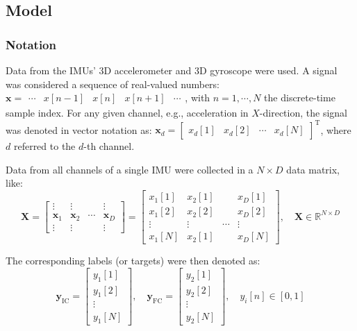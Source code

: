 \documentclass[sensors,article,submit,pdftex,moreauthors]{Definitions/mdpi}
\begin{document}
\subsection{Model}
\subsubsection{Notation}
Data from the IMUs' 3D accelerometer and 3D gyroscope were used. A signal was considered a sequence of real-valued numbers: $\mathbf{x} = \begin{array}{ccccc}
	\cdots & x[n-1] & x[n] & x[n+1] & \cdots
\end{array}$, with $n = 1, \cdots, N$ the discrete-time sample index. For any given channel, e.g., acceleration in $X$-direction, the signal was denoted in vector notation as: $\mathbf{x}_{d} = \begin{bmatrix}
x_{d}[1] & x_{d}[2] & \cdots & x_{d}[N]
\end{bmatrix}^{\mathrm{T}}$, where $d$ referred to the $d$-th channel.

Data from all channels of a single IMU were collected in a $ N \times D$ data matrix, like:
\begin{equation}
	\mathbf{X} = \begin{bmatrix}
		\vdots & \vdots &  & \vdots\\
		\mathbf{x}_{1} & \mathbf{x}_{2} & \cdots & \mathbf{x}_{D}\\
		\vdots & \vdots &  & \vdots
	\end{bmatrix} = \begin{bmatrix}
		x_{1}[1] & x_{2}[1] & & x_{D}[1]\\
		x_{1}[2] & x_{2}[2] & & x_{D}[2]\\
		\vdots & \vdots & \cdots & \vdots\\
		x_{1}[N] & x_{2}[1] & & x_{D}[N]\end{bmatrix}, \quad \mathbf{X} \in \mathbb{R}^{N \times D}
	\label{eqn:train_data_single_instance}
\end{equation}

The corresponding labels (or targets) were then denoted as:
\begin{equation}
	\mathbf{y}_{\mathrm{IC}} = \begin{bmatrix}
		y_{1}[1]\\
		y_{1}[2]\\
		\vdots\\
		y_{1}[N]
	\end{bmatrix}, \quad \mathbf{y}_{\mathrm{FC}} = \begin{bmatrix}
		y_{2}[1]\\
		y_{2}[2]\\
		\vdots\\
		y_{2}[N]
	\end{bmatrix}, \quad y_{i}[n] \in [0, 1]
	\label{eqn:train_labels_single_instace}
\end{equation}
\end{document}
